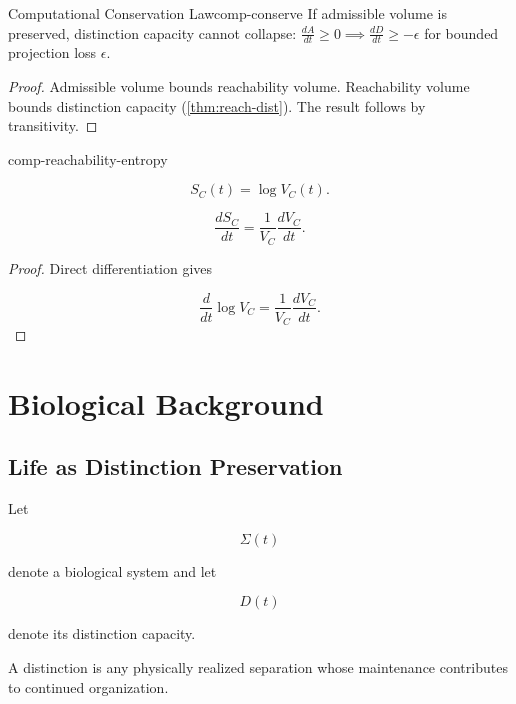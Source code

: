 \documentclass[12pt,twoside,openright]{book}
\newenvironment{prop}
{\begin{proposition}{}{}}
{\end{proposition}}
\begin{document}
\begin{theorem}{Computational Conservation Law}{comp-conserve}
  If admissible volume is preserved, distinction capacity
  cannot collapse:
  $\frac{dA}{dt} \ge 0 \implies \frac{dD}{dt} \ge -\epsilon$
  for bounded projection loss $\epsilon$.
\end{theorem}

\begin{proof}
  Admissible volume bounds reachability volume.
  Reachability volume bounds distinction capacity
  (\cref{thm:reach-dist}).
  The result follows by transitivity.
\end{proof}

\begin{definition}{comp-reachability-entropy}

\[
S_C(t)
=
\log V_C(t).
\]

\end{definition}

\begin{prop}

\[
\frac{dS_C}{dt}
=
\frac{1}{V_C}
\frac{dV_C}{dt}.
\]

\end{prop}

\begin{proof}

Direct differentiation gives

\[
\frac{d}{dt}
\log V_C
=
\frac{1}{V_C}
\frac{dV_C}{dt}.
\]

\end{proof}


\chapter{Biological Background}
\label{app:bio}
\section{Life as Distinction Preservation}

Let

\[
\Sigma(t)
\]

denote a biological system and let

\[
D(t)
\]

denote its distinction capacity.

A distinction is any physically realized separation whose
maintenance contributes to continued organization.
\end{document}
